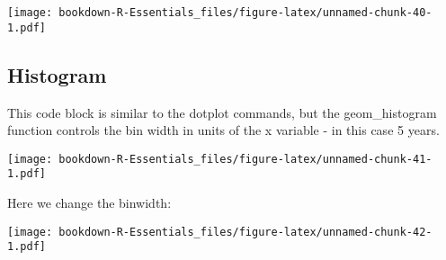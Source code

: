 \documentclass[]{book}
\newenvironment{Shaded}{\begin{snugshade}}{\end{snugshade}}
\newcommand{\KeywordTok}[1]{\textcolor[rgb]{0.13,0.29,0.53}{\textbf{#1}}}
\newcommand{\DataTypeTok}[1]{\textcolor[rgb]{0.13,0.29,0.53}{#1}}
\newcommand{\DecValTok}[1]{\textcolor[rgb]{0.00,0.00,0.81}{#1}}
\newcommand{\FloatTok}[1]{\textcolor[rgb]{0.00,0.00,0.81}{#1}}
\newcommand{\StringTok}[1]{\textcolor[rgb]{0.31,0.60,0.02}{#1}}
\newcommand{\OperatorTok}[1]{\textcolor[rgb]{0.81,0.36,0.00}{\textbf{#1}}}
\newcommand{\NormalTok}[1]{#1}
\begin{document}
\texttt{[image: bookdown-R-Essentials\_files/figure-latex/unnamed-chunk-40-1.pdf]}

\subsection{Histogram}\label{histogram}

This code block is similar to the dotplot commands, but the
geom\_histogram function controls the bin width in units of the x
variable - in this case 5 years.

\begin{Shaded}
\end{Shaded}

\texttt{[image: bookdown-R-Essentials\_files/figure-latex/unnamed-chunk-41-1.pdf]}

Here we change the binwidth:

\begin{Shaded}
\end{Shaded}

\texttt{[image: bookdown-R-Essentials\_files/figure-latex/unnamed-chunk-42-1.pdf]}
\end{document}
